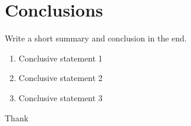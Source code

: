 \section{Conclusions}

Write a short summary and conclusion in the end. 

   \begin{enumerate}
      \item Conclusive statement 1
      \item Conclusive statement 2
      \item Conclusive statement 3
   \end{enumerate}

\begin{acknowledgements}
      Thank
\end{acknowledgements}
